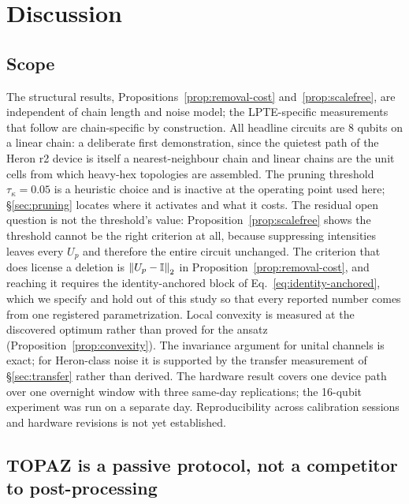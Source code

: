 \documentclass[twocolumn,aps,prl,superscriptaddress,showkeys]{revtex4-2}
\theoremstyle{plain}
\theoremstyle{definition}
\begin{document}
\section{Discussion}
\label{sec:discussion}

\subsection{Scope}

The structural results, Propositions~\ref{prop:removal-cost} and~\ref{prop:scalefree}, are independent of chain length and noise model; the LPTE-specific measurements that follow are chain-specific by construction. All headline circuits are 8 qubits on a linear chain: a deliberate first demonstration, since the quietest path of the Heron r2 device is itself a nearest-neighbour chain and linear chains are the unit cells from which heavy-hex topologies are assembled. The pruning threshold $\tau_\kappa=0.05$ is a heuristic choice and is inactive at the operating point used here; \S\ref{sec:pruning} locates where it activates and what it costs. The residual open question is not the threshold's value: Proposition~\ref{prop:scalefree} shows the threshold cannot be the right criterion at all, because suppressing intensities leaves every $U_p$ and therefore the entire circuit unchanged. The criterion that does license a deletion is $\norm{U_p-\mathbb{I}}_2$ in Proposition~\ref{prop:removal-cost}, and reaching it requires the identity-anchored block of Eq.~\eqref{eq:identity-anchored}, which we specify and hold out of this study so that every reported number comes from one registered parametrization. Local convexity is measured at the discovered optimum rather than proved for the ansatz (Proposition~\ref{prop:convexity}). The invariance argument for unital channels is exact; for Heron-class noise it is supported by the transfer measurement of \S\ref{sec:transfer} rather than derived. The hardware result covers one device path over one overnight window with three same-day replications; the 16-qubit experiment was run on a separate day. Reproducibility across calibration sessions and hardware revisions is not yet established.

\subsection{TOPAZ is a passive protocol, not a competitor to post-processing}
\end{document}
